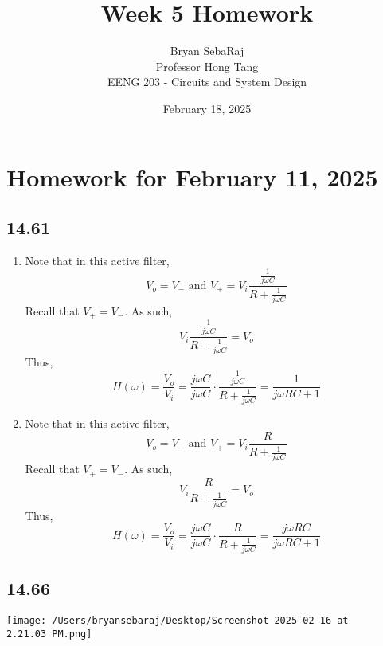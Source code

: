 \documentclass{article}
\title{Week 5 Homework}
\author{Bryan SebaRaj \\[0.7em] Professor Hong Tang \\[0.7em]  EENG 203 - Circuits and System Design}
\date{February 18, 2025}
\begin{document}
\maketitle

\section*{Homework for February 11, 2025}

\subsection*{14.61}

\begin{enumerate}[label=(\alph*)]
    \item Note that in this active filter, $$V_o=V_- \text{ and } V_+=
        V_i \frac{\frac{1}{j\omega C}}{R+\frac{1}{j \omega C}}$$
        Recall that $V_+=V_-$. As such, 
        $$V_i \frac{\frac{1}{j\omega C}}{R+\frac{1}{j \omega C}}=V_o$$
        Thus, $$H(\omega)=\frac{V_o}{V_i}=\frac{j\omega C}{j\omega C}\cdot \frac{\frac{1}{j\omega C}}{R+\frac{1}{j \omega C}}=\frac{1}{j\omega RC + 1}$$
    \item Note that in this active filter, $$V_o=V_- \text{ and } V_+=V_i\frac{R}{R + \frac{1}{j\omega C}}$$
        Recall that $V_+=V_-$. As such,
        $$V_i\frac{R}{R + \frac{1}{j\omega C}}=V_o$$
        Thus, $$H(\omega)=\frac{V_o}{V_i}=\frac{j\omega C}{j \omega C} \cdot \frac{R}{R + \frac{1}{j\omega C}}=\frac{j\omega RC}{j\omega RC + 1}$$
\end{enumerate}


\subsection*{14.66}
\texttt{[image: /Users/bryansebaraj/Desktop/Screenshot 2025-02-16 at 2.21.03 PM.png]}
\end{document}
